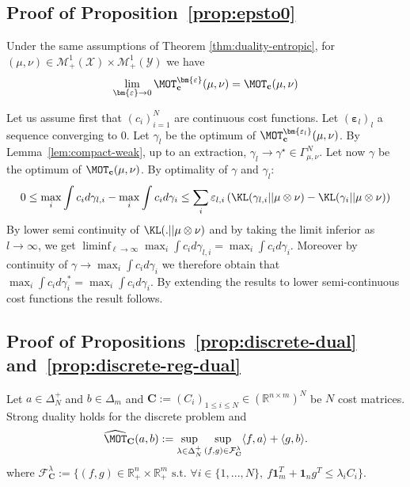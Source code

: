 \subsection{Proof of Proposition~\ref{prop:epsto0}}
\begin{prop*}
Under the same assumptions of Theorem \ref{thm:duality-entropic}, for $(\mu,\nu)\in\mathcal{M}_+^{1}(\mathcal{X})\times\mathcal{M}_+^{1}(\mathcal{Y})$ we have
\begin{align*}
  \lim_{\bm{\varepsilon}\to0} \MOT_{\mathbf{c}}^{\bm{\varepsilon}}(\mu,\nu) = \MOT_{\mathbf{c}}(\mu,\nu)
\end{align*}
\end{prop*}
\begin{prv*}
Let us assume first that $(c_i)_{i=1}^N$ are continuous cost functions.
Let $(\bm{\varepsilon}_l)_l$ a sequence converging to $0$. Let $\gamma_l$ be the optimum of $\MOT^{\bm{\varepsilon_l}}_\mathbf{c}(\mu,\nu)$. By Lemma~\ref{lem:compact-weak}, up to an extraction, $\gamma_l\rightarrow \gamma^\star\in\Gamma^N_{\mu,\nu}$. Let now $\gamma$ be the optimum of $\MOT_\mathbf{c}(\mu,\nu)$. By optimality of $\gamma$ and $\gamma_l$: \begin{align*}
    0\leq \max_i \int c_id\gamma_{l,i}-\max_i \int c_id\gamma_{i}\leq\sum_i\varepsilon_{l,i}\left(\KL(\gamma_{l,i}||\mu\otimes\nu)-\KL(\gamma_{i}||\mu\otimes\nu)\right)
\end{align*}
By lower semi continuity of $\KL(.||\mu\otimes\nu)$ and by taking the limit inferior as $l\to\infty$, we get $\liminf_{\ell\rightarrow\infty}\max_i \int c_id\gamma_{l,i}=\max_i \int c_id\gamma_{i}$. Moreover by continuity of $\gamma\rightarrow \max_i\int c_i d\gamma_i$  we therefore obtain that $\max_i \int c_id\gamma^*_{i}=\max_i \int c_id\gamma_{i}$. By extending the results to lower semi-continuous cost functions the result follows.
\end{prv*}

\subsection{Proof of Propositions~\ref{prop:discrete-dual} and~\ref{prop:discrete-reg-dual}}
\begin{prop*}

Let $a\in\Delta_N^{+}$ and $b\in\Delta_m$ and $\mathbf{C}:=(C_i)_{1\leq i\leq N}\in\left(\mathbb{R}^{n\times m}\right)^N$ be $N$ cost matrices. Strong duality holds for the discrete problem and
\begin{align*}
\widehat{\MOT}_{\mathbf{C}}(a,b):=\sup_{\lambda\in\Delta_N^{+}}\sup\limits_{(f,g)\in\mathcal{F}^{\lambda}_{\mathbf{C}}} \langle f,a\rangle+\langle g,b\rangle.
\end{align*}
where $\mathcal{F}^{\lambda}_{\mathbf{C}}:=\{(f,g)\in\mathbb{R}_{+}^n\times\mathbb{R}_{+}^m\text{ s.t. }\forall i\in\{1,...,N\},~ f\mathbf{1}_m^T+\mathbf{1}_n g^T\leq\lambda_i C_i\}$.
\end{prop*}

